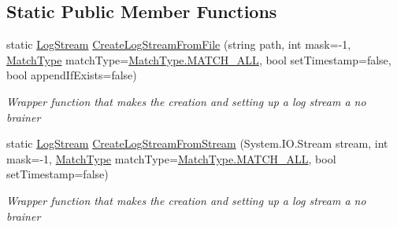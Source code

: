 \subsection*{Static Public Member Functions}
\begin{DoxyCompactItemize}
\item 
static \mbox{\hyperlink{class_a_d_l_1_1_log_stream}{Log\+Stream}} \mbox{\hyperlink{class_a_d_l_1_1_log_stream_a5369ad1bfec52a786117832f74454054}{Create\+Log\+Stream\+From\+File}} (string path, int mask=-\/1, \mbox{\hyperlink{namespace_a_d_l_af6334296dbae0383a652317263f0bc05}{Match\+Type}} match\+Type=\mbox{\hyperlink{namespace_a_d_l_af6334296dbae0383a652317263f0bc05a627c7991c5d0265194247e92fcf120b0}{Match\+Type.\+M\+A\+T\+C\+H\+\_\+\+A\+LL}}, bool set\+Timestamp=false, bool append\+If\+Exists=false)
\begin{DoxyCompactList}\small\item\em Wrapper function that makes the creation and setting up a log stream a no brainer \end{DoxyCompactList}\item 
static \mbox{\hyperlink{class_a_d_l_1_1_log_stream}{Log\+Stream}} \mbox{\hyperlink{class_a_d_l_1_1_log_stream_a2bdd5573b2877b6b1d93d336b8592489}{Create\+Log\+Stream\+From\+Stream}} (System.\+I\+O.\+Stream stream, int mask=-\/1, \mbox{\hyperlink{namespace_a_d_l_af6334296dbae0383a652317263f0bc05}{Match\+Type}} match\+Type=\mbox{\hyperlink{namespace_a_d_l_af6334296dbae0383a652317263f0bc05a627c7991c5d0265194247e92fcf120b0}{Match\+Type.\+M\+A\+T\+C\+H\+\_\+\+A\+LL}}, bool set\+Timestamp=false)
\begin{DoxyCompactList}\small\item\em Wrapper function that makes the creation and setting up a log stream a no brainer \end{DoxyCompactList}\end{DoxyCompactItemize}

